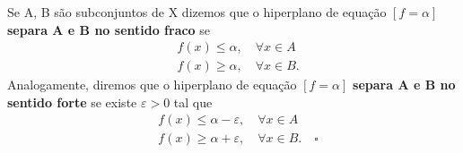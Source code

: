 \documentclass[../functional_analysis.tex]{subfiles}
\begin{document}
\begin{def*}
	Se A, B são subconjuntos de X dizemos que o hiperplano de equação \([f=\alpha ]\) \textbf{separa A e B no sentido fraco} se
	\begin{align*}
		 & f(x)\leq \alpha ,\quad \forall x\in A  \\
		 & f(x)\geq \alpha ,\quad \forall x\in B.
	\end{align*}
	Analogamente, diremos que o hiperplano de equação \([f=\alpha ]\) \textbf{separa A e B no sentido forte} se existe \(\varepsilon >0\) tal que
	\begin{align*}
		 & f(x)\leq \alpha -\varepsilon ,\quad \forall x\in A               \\
		 & f(x)\geq \alpha+\varepsilon  ,\quad \forall x\in B.\quad \square
	\end{align*}
\end{def*}
\end{document}
